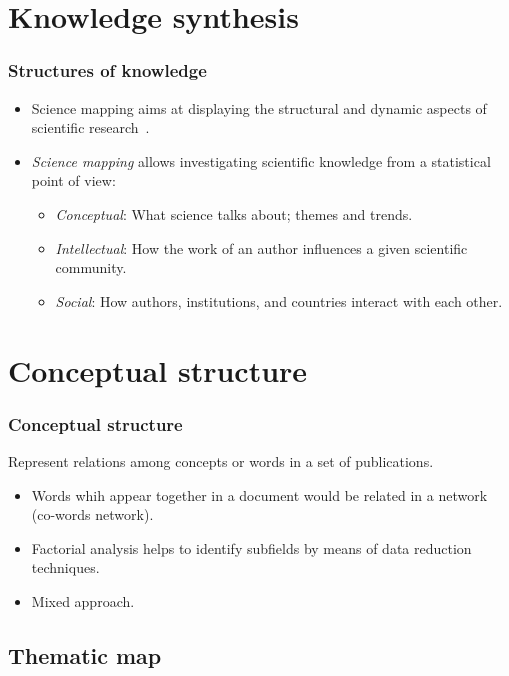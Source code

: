 \documentclass[aspectratio=169]{beamer}
\begin{document}
\section{Knowledge synthesis}

\begin{frame}
	\frametitle{Structures of knowledge}
	\begin{itemize}
		\item Science mapping aims at displaying the structural and dynamic aspects of
		      scientific research~\cite{borner2003}.
		\item \emph{Science mapping} allows investigating scientific knowledge from a
		      statistical point of view:
		      \begin{itemize}
			      \item \emph{Conceptual}: What science talks about; themes and 
                      trends.
			      \item \emph{Intellectual}: How the work of an author 
                      influences a given scientific community.
			      \item \emph{Social}: How authors, institutions, and countries 
                      interact with each other.
		      \end{itemize}
	\end{itemize}
\end{frame}



\section{Conceptual structure}

\begin{frame}
	\frametitle{Conceptual structure}
	Represent relations among concepts or words in a set of publications.
    \begin{itemize}
        \item Words whih appear together in a document would be related in a 
            network (co-words network). 
        \item Factorial analysis helps to identify subfields by means of data
            reduction techniques.
        \item Mixed approach.
    \end{itemize}
\end{frame}



\subsection{Thematic map}
\end{document}
